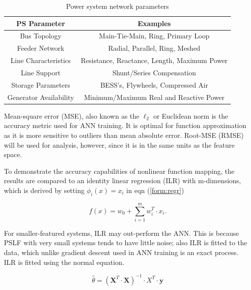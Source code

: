 \documentclass[conference]{IEEEtran}
\begin{document}
\begin{table}[h]
\centering
 \begin{tabular}{|c c|} 
  \hline
PS Parameter & Examples \\ %
 \hline\hline
Bus Topology & Main-Tie-Main, Ring, Primary Loop \\
 \hline
Feeder Network & Radial, Parallel, Ring, Meshed  \\ 
 \hline
Line Characteristics & Resistance, Reactance, Length, Maximum Power  \\
\hline
Line Support & Shunt/Series Compensation \\
\hline
Storage Parameters & BESS's, Flywheels, Compressed Air \\
\hline
Generator Availability & Minimum/Maximum Real and Reactive Power \\
\hline
\end{tabular} \vspace{1mm}
\caption[Power system network parameters]{Power system network parameters}
\label{table:sim model}
\end{table}
\vspace{-1.5em}

Mean-square error (MSE), also known as the $\ell_{2}$ or Euclidean norm is the accuracy metric used for ANN training. It is optimal for function approximation as it is more sensitive to outliers than mean absolute error. Root-MSE (RMSE) will be used for analysis, however, since it is in the same units as the feature space.

To demonstrate the accuracy capabilities of nonlinear function mapping, the results are compared to an identity linear regression (ILR) with m-dimensions, which is derived by setting $\phi_{i}(x) = x_{i}$ in eqn (\ref{form:regr})

\begin{equation} f(x) = w_{0} + \sum_{i =1}^{m}w_{i}^{T} \cdot x_{i}. \label{form: idnregr} \end{equation}

For smaller-featured systems, ILR may out-perform the ANN. This is because PSLF with very small systems tends to have little noise; also ILR is fitted to the data, which unlike gradient descent used in ANN training is an exact process. ILR is fitted using the normal equation.

\begin{equation} \hat{\theta} = (\textbf{X}^T \cdot \textbf{X})^{-1} \cdot{X}^T \cdot \textbf{y} \label{form:normaleqn} \end{equation}
\end{document}

